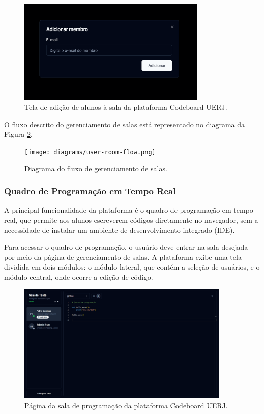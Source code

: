 \begin{figure}[H]
    \centering
    \includegraphics[width=0.8\textwidth]{assets/codeboard/add-member-modal.png}
    \caption{Tela de adição de alunos à sala da plataforma Codeboard UERJ.}
    \label{fig:add-member-modal}
\end{figure}


O fluxo descrito do gerenciamento de salas está representado no diagrama da Figura \ref{fig:user-room-flow}.


\begin{figure}[H]
    \centering
    \texttt{[image: diagrams/user-room-flow.png]}
    \caption{Diagrama do fluxo de gerenciamento de salas.}
    \label{fig:user-room-flow}
\end{figure}


\subsubsection{Quadro de Programação em Tempo Real}

A principal funcionalidade da plataforma é o quadro de programação em tempo real, que permite aos alunos escreverem códigos diretamente no navegador, sem a necessidade de instalar um ambiente de desenvolvimento integrado (IDE).

Para acessar o quadro de programação, o usuário deve entrar na sala desejada por meio da página de gerenciamento de salas. A plataforma exibe uma tela dividida em dois módulos: o módulo lateral, que contém a seleção de usuários, e o módulo central, onde ocorre a edição de código.

\begin{figure}[H]
    \centering
    \includegraphics[width=0.9\textwidth]{assets/codeboard/room-details-page.png}
    \caption{Página da sala de programação da plataforma Codeboard UERJ.}
    \label{fig:room-details-page}
\end{figure}

